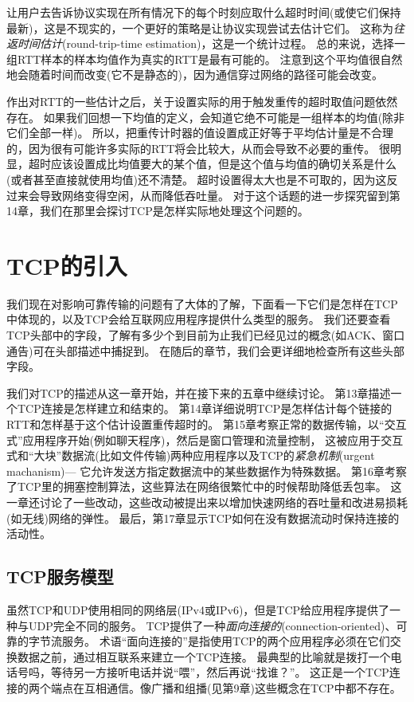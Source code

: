 \documentclass{../main.tex}{subfiles}
\begin{document}
让用户去告诉协议实现在所有情况下的每个时刻应取什么超时时间(或使它们保持最新)，这是不现实的，一个更好的策略是让协议实现尝试去估计它们。
这称为\emph{往返时间估计}(round-trip-time estimation)，这是一个统计过程。
总的来说，选择一组RTT样本的样本均值作为真实的RTT是最有可能的。
注意到这个平均值很自然地会随着时间而改变(它不是静态的)，因为通信穿过网络的路径可能会改变。

作出对RTT的一些估计之后，关于设置实际的用于触发重传的超时取值问题依然存在。
如果我们回想一下均值的定义，会知道它绝不可能是一组样本的均值(除非它们全部一样)。
所以，把重传计时器的值设置成正好等于平均估计量是不合理的，因为很有可能许多实际的RTT将会比较大，从而会导致不必要的重传。
很明显，超时应该设置成比均值要大的某个值，但是这个值与均值的确切关系是什么(或者甚至直接就使用均值)还不清楚。
超时设置得太大也是不可取的，因为这反过来会导致网络变得空闲，从而降低吞吐量。
对于这个话题的进一步探究留到第14章，我们在那里会探讨TCP是怎样实际地处理这个问题的。


\section{TCP的引入}
我们现在对影响可靠传输的问题有了大体的了解，下面看一下它们是怎样在TCP中体现的，以及TCP会给互联网应用程序提供什么类型的服务。
我们还要查看TCP头部中的字段，了解有多少个到目前为止我们已经见过的概念(如ACK、窗口通告)可在头部描述中捕捉到。
在随后的章节，我们会更详细地检查所有这些头部字段。

我们对TCP的描述从这一章开始，并在接下来的五章中继续讨论。
第13章描述一个TCP连接是怎样建立和结束的。
第14章详细说明TCP是怎样估计每个链接的RTT和怎样基于这个估计设置重传超时的。
第15章考察正常的数据传输，以``交互式''应用程序开始(例如聊天程序)，然后是窗口管理和流量控制，
    这被应用于交互式和``大块''数据流(比如文件传输)两种应用程序以及TCP的\emph{紧急机制}(urgent machanism)---
    它允许发送方指定数据流中的某些数据作为特殊数据。
第16章考察了TCP里的拥塞控制算法，这些算法在网络很繁忙中的时候帮助降低丢包率。
这一章还讨论了一些改动，这些改动被提出来以增加快速网络的吞吐量和改进易损耗(如无线)网络的弹性。
最后，第17章显示TCP如何在没有数据流动时保持连接的活动性。


\subsection{TCP服务模型}
虽然TCP和UDP使用相同的网络层(IPv4或IPv6)，但是TCP给应用程序提供了一种与UDP完全不同的服务。
TCP提供了一种\emph{面向连接的}(connection-oriented)、可靠的字节流服务。
术语``面向连接的''是指使用TCP的两个应用程序必须在它们交换数据之前，通过相互联系来建立一个TCP连接。
最典型的比喻就是拨打一个电话号吗，等待另一方接听电话并说``喂''，然后再说``找谁？''。
这正是一个TCP连接的两个端点在互相通信。像广播和组播(见第9章)这些概念在TCP中都不存在。
\end{document}
